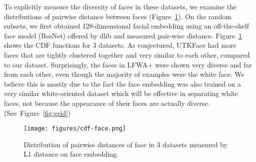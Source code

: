 To explicitly measure the diversity of faces in these datasets, we examine the distributions of pairwise distance between faces (Figure~\ref{fig:cdf}). On the random subsets, we first obtained 128-dimensional facial embedding using an off-the-shelf face model (ResNet) offered by dlib and measured pair-wise distance. Figure~\ref{fig:cdf} shows the CDF functions for 3 datasets. As conjectured, UTKFace had more faces that are tightly clustered together and very similar to each other, compared to our dataset. Surprisingly, the faces in LFWA+ were shown very diverse and far from each other, even though the majority of examples were the white face. We believe this is mostly due to the fact the face embedding was also trained on a very similar white-oriented dataset which will be effective in separating white faces, not because the appearance of their faces are actually diverse. (See~Figure~\ref{fig:grid})



\begin{figure}
  \centering
      \texttt{[image: figures/cdf-face.png]}
  \caption{Distribution of pairwise distances of face in 3 datasets measured by L1 distance on face embedding. }
\label{fig:cdf}
\end{figure}



